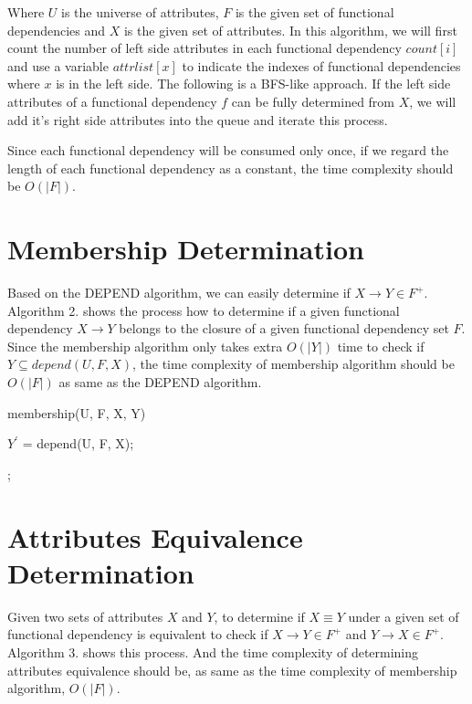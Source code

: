 \documentclass[11pt]{book}
\begin{document}
Where $U$ is the universe of attributes, $F$ is the given set of functional dependencies and $X$ is the given set of attributes. In this algorithm, we will first count the number of left side attributes in each functional dependency $count[i]$ and use a variable $attrlist[x]$ to indicate the indexes of functional dependencies where $x$ is in the left side. The following is a BFS-like approach.
If the left side attributes of a functional dependency $f$ can be fully determined from $X$, we will add it's right side attributes into the queue and iterate this process.

Since each functional dependency will be consumed only once, if we regard the length of each functional dependency as a constant, the time complexity should be $O(\lvert F \rvert)$.

\section{Membership Determination}

Based on the DEPEND algorithm, we can easily determine if $X \rightarrow Y \in F^+$. Algorithm 2. shows the process how to determine if a given functional dependency $X \to Y$ belongs to the closure of a given functional dependency set $F$. Since the membership algorithm only takes extra $O(|Y|)$ time to check if $Y \subseteq depend(U, F, X)$, the time complexity of membership algorithm should be $O(|F|)$ as same as the DEPEND algorithm.

\begin{algorithm}

  \caption{membership(U, F, X, Y)}

  \SetAlgoLined

  $Y^{'}$ = depend(U, F, X);
  
  
  ;

\end{algorithm}

\section{Attributes Equivalence Determination}

Given two sets of attributes $X$ and $Y$, to determine if $X \equiv Y$ under a given set of functional dependency is equivalent to check if $X \rightarrow Y \in F^{+}$ and $Y \rightarrow X \in F^{+}$. Algorithm 3. shows this process. And the time complexity of determining attributes equivalence should be, as same as the time complexity of membership algorithm, $O(|F|)$.
\end{document}

